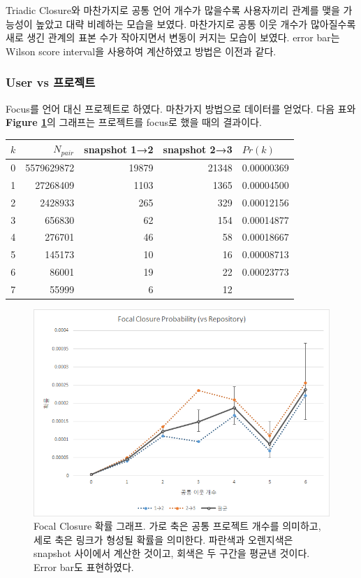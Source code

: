 \documentclass[10pt, a4paper, titlepage]{article}
\begin{document}
Triadic Closure와 마찬가지로 공통 언어 개수가 많을수록 사용자끼리 관계를 맺을 가능성이 높았고 대략 비례하는 모습을 보였다. 마찬가지로 공통 이웃 개수가 많아질수록 새로 생긴 관계의 표본 수가 작아지면서 변동이 커지는 모습이 보였다.
error bar는 Wilson score interval을 사용하여 계산하였고 방법은 이전과 같다.



\subsubsection{User vs 프로젝트}

Focus를 언어 대신 프로젝트로 하였다. 마찬가지 방법으로 데이터를 얻었다. 다음 표와 {\bf Figure \ref{fig:focalrepo}}의 그래프는 프로젝트를 focus로 했을 때의 결과이다.

\begin{longtable}{|c|r|r|r|l|}

\hline
\rowcolor[gray]{0.8}
$k$ & 
$N_{pair}$ & 
snapshot 1→2 &
snapshot 2→3 & 
$Pr(k)$ \\ \hline
0 &
5579629872 &
19879 &
21348 &
0.00000369 \\ \hline
1 &
27268409 &
1103 &
1365 &
0.00004500 \\ \hline
2 &
2428933 &
265 &
329 &
0.00012156 \\ \hline
3 &
656830 &
62 &
154 &
0.00014877 \\ \hline
4 &
276701 &
46 &
58 &
0.00018667 \\ \hline
5 &
145173 &
10 &
16 &
0.00008713 \\ \hline
6 &
86001 &
19 &
22 &
0.00023773 \\ \hline
7 &
55999 &
6 &
12 &
 \\ \hline

\end{longtable}


\begin{figure}
\includegraphics[width=\textwidth]{image07}
\caption{Focal Closure 확률 그래프. 가로 축은 공통 프로젝트 개수를 의미하고, 세로 축은 링크가 형성될 확률을 의미한다. 파란색과 오렌지색은 snapshot 사이에서 계산한 것이고, 회색은 두 구간을 평균낸 것이다. Error bar도 표현하였다.}
\label{fig:focalrepo}
\end{figure}
\end{document}
